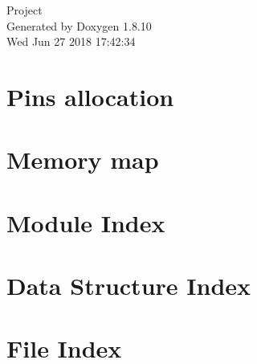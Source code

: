 \documentclass[twoside]{book}
\newcommand{\+}{\discretionary{\mbox{\scriptsize$\hookleftarrow$}}{}{}}
\newcommand{\clearemptydoublepage}{%
  \newpage{\pagestyle{empty}\cleardoublepage}%
}
\begin{document}
\hypersetup{pageanchor=false,
             bookmarks=true,
             bookmarksnumbered=true,
             pdfencoding=unicode
            }
\begin{titlepage}
\vspace*{7cm}
\begin{center}%
{\Large Project }\\
\vspace*{1cm}
{\large Generated by Doxygen 1.8.10}\\
\vspace*{0.5cm}
{\small Wed Jun 27 2018 17:42:34}\\
\end{center}
\end{titlepage}
\clearemptydoublepage
\tableofcontents
\clearemptydoublepage
{}
\hypersetup{pageanchor=true}

\chapter{Pins allocation}
\label{page_pinalloc}
\hypertarget{page_pinalloc}{}

\chapter{Memory map}
\label{page_memorymap}
\hypertarget{page_memorymap}{}

\chapter{Module Index}

\chapter{Data Structure Index}

\chapter{File Index}

\end{document}
